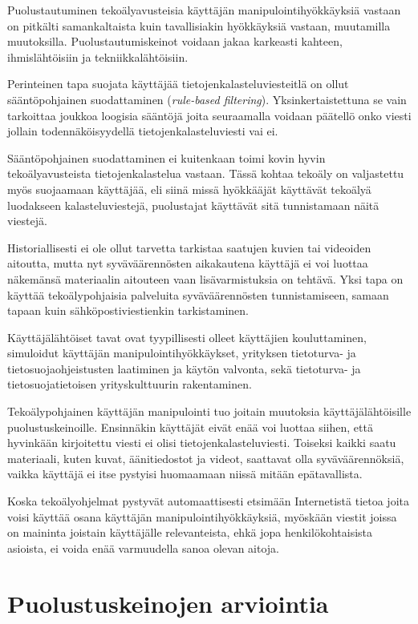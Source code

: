 Puolustautuminen tekoälyavusteisia käyttäjän manipulointihyökkäyksiä vastaan on pitkälti samankaltaista kuin tavallisiakin hyökkäyksiä vastaan, muutamilla muutoksilla. Puolustautumiskeinot voidaan jakaa karkeasti kahteen, ihmislähtöisiin ja tekniikkalähtöisiin.

Perinteinen tapa suojata käyttäjää tietojenkalasteluviesteitlä on ollut sääntöpohjainen suodattaminen (\textit{rule-based filtering}). Yksinkertaistettuna se vain tarkoittaa joukkoa loogisia sääntöjä joita seuraamalla voidaan päätellö onko viesti jollain todennäköisyydellä tietojenkalasteluviesti vai ei.

Sääntöpohjainen suodattaminen ei kuitenkaan toimi kovin hyvin tekoälyavusteista tietojenkalastelua vastaan. Tässä kohtaa tekoäly on valjastettu myös suojaamaan käyttäjää, eli siinä missä hyökkääjät käyttävät tekoälyä luodakseen kalasteluviestejä, puolustajat käyttävät sitä tunnistamaan näitä viestejä.

Historiallisesti ei ole ollut tarvetta tarkistaa saatujen kuvien tai videoiden aitoutta, mutta nyt syväväärennösten aikakautena käyttäjä ei voi luottaa näkemänsä materiaalin aitouteen vaan lisävarmistuksia on tehtävä. Yksi tapa on käyttää tekoälypohjaisia palveluita syväväärennösten tunnistamiseen, samaan tapaan kuin sähköpostiviestienkin tarkistaminen.

Käyttäjälähtöiset tavat ovat tyypillisesti olleet käyttäjien kouluttaminen, simuloidut käyttäjän manipulointihyökkäykset, yrityksen tietoturva- ja tietosuojaohjeistusten laatiminen ja käytön valvonta, sekä tietoturva- ja tietosuojatietoisen yrityskulttuurin rakentaminen.

Tekoälypohjainen käyttäjän manipulointi tuo joitain muutoksia käyttäjälähtöisille puolustuskeinoille. Ensinnäkin käyttäjät eivät enää voi luottaa siihen, että hyvinkään kirjoitettu viesti ei olisi tietojenkalasteluviesti. Toiseksi kaikki saatu materiaali, kuten kuvat, äänitiedostot ja videot, saattavat olla syväväärennöksiä, vaikka käyttäjä ei itse pystyisi huomaamaan niissä mitään epätavallista.

Koska tekoälyohjelmat pystyvät automaattisesti etsimään Internetistä tietoa joita voisi käyttää osana käyttäjän manipulointihyökkäyksiä, myöskään viestit joissa on maininta joistain käyttäjälle relevanteista, ehkä jopa henkilökohtaisista asioista, ei voida enää varmuudella sanoa olevan aitoja.

\section*{Puolustuskeinojen arviointia}

